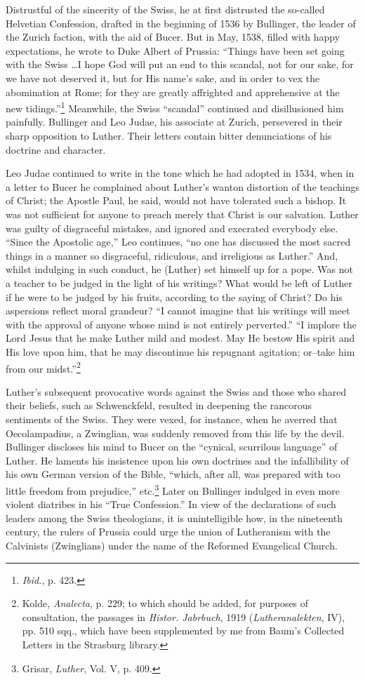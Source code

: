 Distrustful of the sincerity of the Swiss, he at first distrusted the so-called
Helvetian Confession, drafted in the beginning of 1536 by Bullinger, the
leader of the Zurich faction, with the aid of Bucer. But in May, 1538, filled
with happy expectations, he wrote to Duke Albert of Prussia: “Things have
been set going with the Swiss \dots I hope God will put an end to this
scandal, not for our sake, for we have not deserved it, but for His name’s sake,
and in order to vex the abomination at Rome; for they are greatly affrighted
and apprehensive at the new tidings.”\footnote{\textit{Ibid.}, p. 423.}
 Meanwhile, the Swiss “scandal”
continued and disillusioned him painfully. Bullinger and Leo Judae,
his associate at Zurich, persevered in their sharp opposition to Luther. Their letters
contain bitter denunciations of his doctrine and character.

Leo Judae continued to write in the tone which he had adopted in 1534,
when in a letter to Bucer he complained about Luther’s wanton distortion
of the teachings of Christ; the Apostle Paul, he said, would not have
tolerated such a bishop. It was not sufficient for anyone to preach merely that
Christ is our salvation. Luther was guilty of disgraceful mistakes, and
ignored and execrated everybody else. “Since the Apostolic age,” Leo continues,
“no one has discussed the most sacred things in a manner so disgraceful,
ridiculous, and irreligious as Luther.” And, whilst indulging in such conduct,
he (Luther) set himself up for a pope. Was not a teacher to be judged
in the light of his writings? What would be left of Luther if he were to be
judged by his fruits, according to the saying of Christ? Do his aspersions
reflect moral grandeur? “I cannot imagine that his writings will meet with
the approval of anyone whose mind is not entirely perverted.” “I implore
the Lord Jesus that he make Luther mild and modest. May He bestow His
spirit and His love upon him, that he may discontinue his repugnant agitation;
or--take him from our midst.”\footnote
{Kolde, \textit{Analecta}, p. 229; to which should be added, for purposes of consultation, the
passages in \textit{Histor. Jabrbuch}, 1919 (\textit{Lutheranalekten}, IV), pp. 510 sqq., which have been
supplemented by me from Baum’s Collected Letters in the Strasburg library.}

Luther’s subsequent provocative words against the Swiss and those
who shared their beliefs, such as Schwenckfeld, resulted in deepening
the rancorous sentiments of the Swiss. They were vexed, for instance,
when he averred that Oecolampadius, a Zwinglian, was suddenly removed
from this life by the devil. Bullinger discloses his
mind to Bucer on the “cynical, scurrilous language” of Luther. He
laments his insistence upon his own doctrines and the infallibility
of his own German version of the Bible, “which, after all, was prepared
with too little freedom from prejudice,” etc.\footnote{Grisar, \textit{Luther}, Vol. V, p. 409.}
Later on Bullinger indulged
in even more violent diatribes in his “True
Confession.” In view of the declarations of such leaders among the Swiss
theologians, it is unintelligible how, in the nineteenth century, the
rulers of Prussia could urge the union of Lutheranism with the Calvinists
(Zwinglians) under the name of the Reformed Evangelical
Church.
